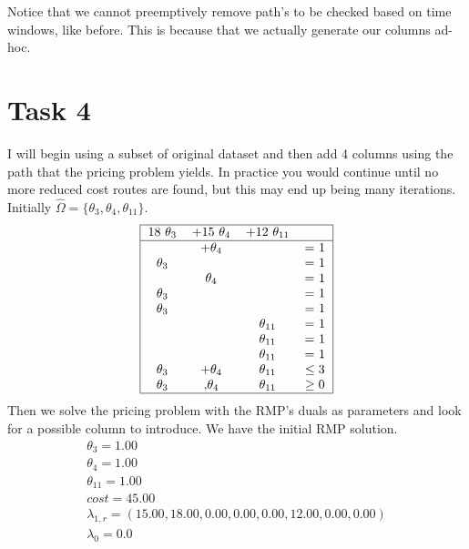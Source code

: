 \documentclass{article}
\begin{document}
    Notice that we cannot preemptively remove path's to be checked based on time windows, like before.
    This is because that we actually generate our columns ad-hoc.

    \section{Task 4}
    I will begin using a subset of original dataset and then add 4 columns using the path that the pricing problem yields.
    In practice you would continue until no more reduced cost routes are found, but this may end up being many iterations.
    Initially $\hat{\Omega} = \{ \theta_3, \theta_4, \theta_{11} \}$.
    \[
        \begin{tabular}{ |c c c c | }
            \hline
            18 $\theta_3$ & +15 $\theta_4$ & +12 $\theta_{11}$ &\\
            \hline
            & +$\theta_4$ &          &  = 1 \\
            $\theta_3$ &  &                      &  = 1 \\
                        & $\theta_4$ &           &  = 1 \\
            $\theta_3$ &  &                      &  = 1 \\
            $\theta_3$ &  &                     &  = 1 \\
              &  &      $\theta_{11}$    &  = 1 \\
              &  &      $\theta_{11}$    &  = 1 \\
              &  &      $\theta_{11}$    &  = 1 \\
           $\theta_3$ & +$\theta_4$ & $\theta_{11}$ & $\leq 3$ \\
           $\theta_3$ & ,$\theta_4$ & $\theta_{11}$ & $\geq 0$ \\
            \hline
        \end{tabular}
    \]
    Then we solve the pricing problem with the RMP's duals as parameters and look for a possible column to introduce.
    We have the initial RMP solution.
    \begin{equation*}
        \begin{array}{c}
            \theta_{3} = 1.00\\
            \theta_{4} = 1.00\\
            \theta_{11} = 1.00\\
            cost = 45.00\\
            \lambda_{1,r} = (15.00,18.00,0.00,0.00,0.00,12.00,0.00,0.00)\\
            \lambda_0 = 0.0
        \end{array}
    \end{equation*}
\end{document}
